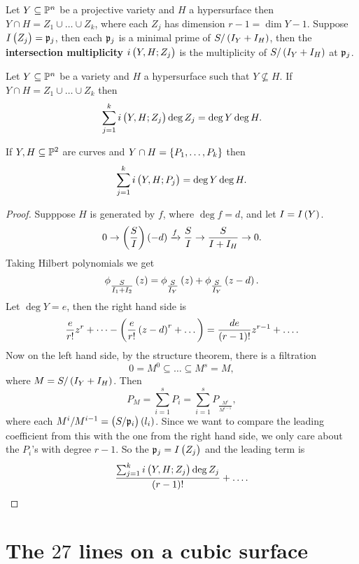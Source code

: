 
Let $ Y \subseteq \mathbb{P}^n $ be a projective variety and $ H $ a hypersurface then $ Y \cap H = Z_1 \cup \dots \cup Z_k $, where each $ Z_j $ has dimension $ r - 1 = \dim Y - 1 $. Suppose $ I\br{Z_j} = \ppp_j $, then each $ \mathfrak{p}_j $ is a minimal prime of $ S / \br{I_Y + I_H} $, then the \textbf{intersection multiplicity} $ i\br{Y, H; Z_j} $ is the multiplicity of $ S / \br{I_Y + I_H} $ at $ \mathfrak{p}_j $.

\begin{theorem}
Let $ Y \subseteq \mathbb{P}^n $ be a variety and $ H $ a hypersurface such that $ Y \nsubseteq H $. If $ Y \cap H = Z_1 \cup \dots \cup Z_k $ then
$$ \sum_{j = 1}^k i\br{Y, H; Z_j}\deg Z_j = \deg Y\deg H. $$
\end{theorem}

\begin{corollary}
If $ Y, H \subseteq \mathbb{P}^2 $ are curves and $ Y \cap H = \cbr{P_1, \dots, P_k} $ then
$$ \sum_{j = 1}^k i\br{Y, H; P_j} = \deg Y\deg H. $$
\end{corollary}

\begin{proof}
Supppose $ H $ is generated by $ f $, where $ \deg f = d $, and let $ I = I\br{Y} $.
$$ 0 \to \br{\dfrac{S}{I}}\br{-d} \xrightarrow{f} \dfrac{S}{I} \to \dfrac{S}{I + I_H} \to 0. $$
Taking Hilbert polynomials we get
$$ \phi_{\tfrac{S}{I_1 + I_2}}\br{z} = \phi_{\tfrac{S}{I_Y}}\br{z} + \phi_{\tfrac{S}{I_Y}}\br{z - d}. $$
Let $ \deg Y = e $, then the right hand side is
$$ \dfrac{e}{r!}z^r + \dots - \br{\dfrac{e}{r!}\br{z - d}^r + \dots} = \dfrac{de}{\br{r - 1}!}z^{r - 1} + \dots. $$
Now on the left hand side, by the structure theorem, there is a filtration
$$ 0 = M^0 \subseteq \dots \subseteq M^s = M, $$
where $ M = S / \br{I_Y + I_H} $. Then
$$ P_M = \sum_{i = 1}^s P_i = \sum_{i = 1}^s P_{\tfrac{M^i}{M^{i - 1}}}, $$
where each $ M^i / M^{i - 1} = \br{S / \ppp_i}\br{l_i} $. Since we want to compare the leading coefficient from this with the one from the right hand side, we only care about the $ P_i $'s with degree $ r - 1 $. So the $ \ppp_j = I\br{Z_j} $ and the leading term is
$$ \dfrac{\sum_{j = 1}^k i\br{Y, H; Z_j}\deg Z_j}{\br{r - 1}!} + \dots. $$
\end{proof}

\pagebreak

\section{The \texorpdfstring{$ 27 $}{27} lines on a cubic surface}

